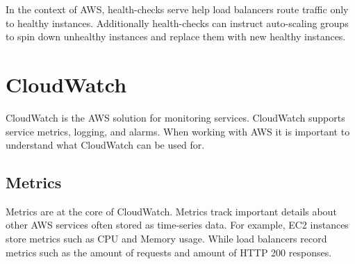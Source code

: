 \documentclass{csse4400}
\begin{document}
In the context of AWS,
health-checks serve help load balancers route traffic only to healthy instances.
Additionally health-checks can instruct auto-scaling groups to spin down unhealthy instances and replace them with new healthy instances.





\section{CloudWatch}

CloudWatch is the AWS solution for monitoring services.
CloudWatch supports service metrics, logging, and alarms.
When working with AWS it is important to understand what CloudWatch can be used for.


\subsection{Metrics}
Metrics are at the core of CloudWatch.
Metrics track important details about other AWS services often stored as time-series data.
For example, EC2 instances store metrics such as CPU and Memory usage.
While load balancers record metrics such as the amount of requests and amount of HTTP 200 responses.
\end{document}
